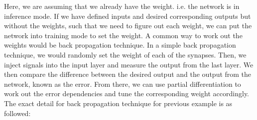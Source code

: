 Here, we are assuming that we already have the weight. i.e. the network is in inference mode. If we have defined inputs and desired corresponding outputs but without the weights, such that we need to figure out each weight, we can put the network into training mode to set the weight. A common way to work out the weights would be back propagation technique. In a simple back propagation technique, we would randomly set the weight of each of the synapses. Then, we inject signals into the input layer and measure the output from the last layer. We then compare the difference between the desired output and the output from the network, known as the error. From there, we can use partial differentiation to work out the error dependencies and tune the corresponding weight accordingly. The exact detail for back propagation technique for previous example is as followed:
